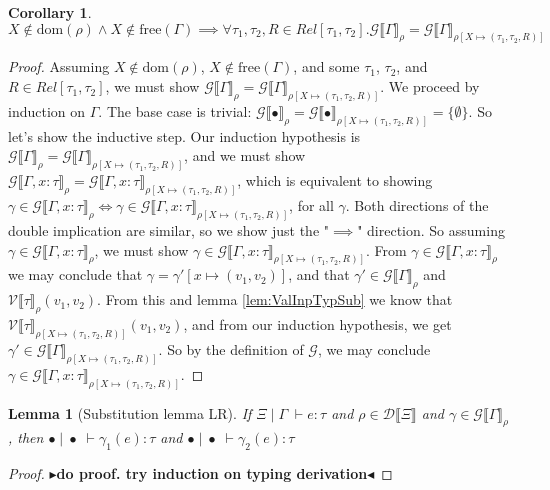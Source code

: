 \documentclass[twoside,11pt,openright]{report}
\newtheorem{corollary}{Corollary}[theorem]
\newtheorem{lemma}[theorem]{Lemma}
\theoremstyle{definition}
\newcommand{\var}{x}
\newcommand{\expr}{e}
\newcommand{\val}{v}
\newcommand{\Tvar}{X}
\newcommand{\typ}{\tau}
\newcommand{\venv}{\Gamma}
\newcommand{\tenv}{\Xi}
\newcommand{\emptenv}{\bullet}
\newcommand{\empvenv}{\bullet}
\newcommand{\jdg}[4]{#1 \; | \; #2 \; \vdash #3 : #4}
\newcommand{\ValInp}[2]{\mathcal{V} \llbracket #1 \rrbracket_{#2}}
\newcommand{\VenvInp}[2]{\mathcal{G} \llbracket #1 \rrbracket_{#2}}
\newcommand{\TenvInp}[1]{\mathcal{D} \llbracket #1 \rrbracket}
\newcommand{\map}[2]{#1 \mapsto #2}
\newcommand{\todo}[1]{{\color[rgb]{.5,0,0}\textbf{$\blacktriangleright$#1$\blacktriangleleft$}}}
\begin{document}
\begin{corollary}\label{cor:VenvInp}
  $\Tvar \notin \mathrm{dom}(\rho) \land \Tvar \notin \mathrm{free}(\venv) \implies \forall \typ_1, \typ_2, R \in Rel[\typ_1, \typ_2] . \VenvInp{\venv}{\rho} = \VenvInp{\venv}{\rho[\map{\Tvar}{(\typ_1, \typ_2, R)}]}$
\end{corollary}
\begin{proof}
  Assuming $\Tvar \notin \mathrm{dom}(\rho)$, $\Tvar \notin \mathrm{free}(\venv)$, and some $\typ_1$, $\typ_2$, and $R \in Rel[\typ_1, \typ_2]$, we must show $\VenvInp{\venv}{\rho} = \VenvInp{\venv}{\rho[\map{\Tvar}{(\typ_1, \typ_2, R)}]}$. We proceed by induction on $\venv$. The base case is trivial: $\VenvInp{\empvenv}{\rho} = \VenvInp{\empvenv}{\rho[\map{\Tvar}{(\typ_1, \typ_2, R)}]} = \{\emptyset\}$. So let's show the inductive step. Our induction hypothesis is $\VenvInp{\venv}{\rho} = \VenvInp{\venv}{\rho[\map{\Tvar}{(\typ_1, \typ_2, R)}]}$, and we must show $\VenvInp{\venv, \var : \typ}{\rho} = \VenvInp{\venv, \var : \typ}{\rho[\map{\Tvar}{(\typ_1, \typ_2, R)}]}$, which is equivalent to showing $\gamma \in \VenvInp{\venv, \var : \typ}{\rho} \iff \gamma \in \VenvInp{\venv, \var : \typ}{\rho[\map{\Tvar}{(\typ_1, \typ_2, R)}]}$, for all $\gamma$. Both directions of the double implication are similar, so we show just the "$\implies$" direction. So assuming $\gamma \in \VenvInp{\venv, \var : \typ}{\rho}$, we must show $\gamma \in \VenvInp{\venv, \var : \typ}{\rho[\map{\Tvar}{(\typ_1, \typ_2, R)}]}$. From $\gamma \in \VenvInp{\venv, \var : \typ}{\rho}$ we may conclude that $\gamma = \gamma'[\map{\var}{(\val_1, \val_2)}]$, and that $\gamma' \in \VenvInp{\venv}{\rho}$ and $\ValInp{\typ}{\rho}(\val_1, \val_2)$. From this and lemma \ref{lem:ValInpTypSub} we know that $\ValInp{\typ}{\rho[\map{\Tvar}{(\typ_1, \typ_2, R)}]}(\val_1, \val_2)$, and from our induction hypothesis, we get $\gamma' \in \VenvInp{\venv}{\rho[\map{\Tvar}{(\typ_1, \typ_2, R)}]}$. So by the definition of $\mathcal{G}$, we may conclude $\gamma \in \VenvInp{\venv, \var : \typ}{\rho[\map{\Tvar}{(\typ_1, \typ_2, R)}]}$.
\end{proof}

\begin{lemma}[Substitution lemma LR]\label{lem:subst_LR}
  If $\jdg{\tenv}{\venv}{\expr}{\typ}$ and $\rho \in \TenvInp{\tenv}$ and $\gamma \in \VenvInp{\venv}{\rho}$, then $\jdg{\emptenv}{\empvenv}{\gamma_1(\expr)}{\typ}$ and $\jdg{\emptenv}{\empvenv}{\gamma_2(\expr)}{\typ}$
\end{lemma}
\begin{proof}
  \todo{do proof. try induction on typing derivation}
\end{proof}
\end{document}

